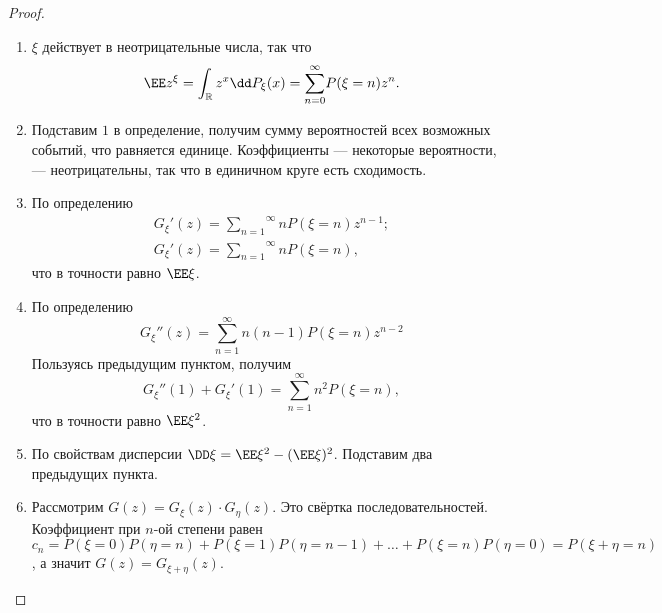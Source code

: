  \begin{proof}
  \enewline
  \begin{enumerate}
      \item $\xi$ действует в неотрицательные числа, так что
      $$\EE z^\xi = \int_\mathbb{R} z^x \dd P_\xi(x) = \overset{\infty}{\underset{n = 0}{\sum}} P(\xi = n)z^n.$$
      \item Подставим $1$ в определение, получим сумму вероятностей всех возможных событий, что равняется единице. Коэффициенты --- некоторые вероятности, --- неотрицательны, так что в единичном круге есть сходимость.
      \item По определению
      \begin{gather*}
          G_\xi'(z) = \overset{\infty}{\underset{n = 1}{\sum}}nP(\xi = n)z^{n - 1};\\
          G_\xi'(z) = \overset{\infty}{\underset{n = 1}{\sum}}nP(\xi = n),
      \end{gather*}
      что в точности равно $\EE \xi$.
      \item По определению
       $$G_\xi''(z) = \overset{\infty}{\underset{n = 1}{\sum}}n(n - 1)P(\xi = n)z^{n - 2}$$
       Пользуясь предыдущим пунктом, получим
       $$G_\xi''(1) + G_\xi'(1) = \overset{\infty}{\underset{n = 1}{\sum}}n^2P(\xi = n),$$
       что в точности равно $\EE \xi^2$.
       \item По свойствам дисперсии $\DD \xi = \EE \xi^2 - (\EE \xi)^2$. Подставим два предыдущих пункта.
       \item Рассмотрим $G(z) = G_\xi(z)\cdot G_\eta(z)$. Это свёртка последовательностей. Коэффициент при $n$-ой степени равен  $c_n = P(\xi = 0)P(\eta = n) + P(\xi =1 )P(\eta = n - 1) + \ldots + P(\xi = n)P(\eta = 0) = P(\xi + \eta = n)$, а значит $G(z) = G_{\xi + \eta}(z)$. \qedhere
  \end{enumerate}
 \end{proof}


